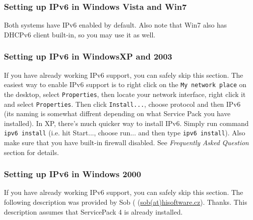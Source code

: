\subsubsection{Setting up IPv6 in Windows Vista and Win7}
Both systems have IPv6 enabled by default. Also note that Win7 also
has DHCPv6 client built-in, so you may use it as well.

\subsubsection{Setting up IPv6 in WindowsXP and 2003}
If you have already working IPv6 support, you can safely skip this section.
The easiest way to enable IPv6 support is to right click on the
\verb+My network place+ on the desktop, select \verb+Properties+, then locate
your network interface, right click it and select \verb+Properties+. Then
click \verb+Install...+, choose protocol and then IPv6 (its naming is
somewhat diffrent depending on what Service Pack you have installed).
In XP, there's much quicker way to install IPv6. Simply run command
\verb+ipv6 install+ (i.e. hit Start..., choose run... and then type
\verb+ipv6 install+). Also make sure that you have built-in firewall
disabled. See \emph{Frequently Asked Question} section for details.

\subsubsection{Setting up IPv6 in Windows 2000}
If you have already working IPv6 support, you can safely skip this
section. The following description was provided by Sob (
(\href{mailto:sob(at)hisoftware.cz}{sob(at)hisoftware.cz}). Thanks. This
description assumes that ServicePack 4 is already installed.

